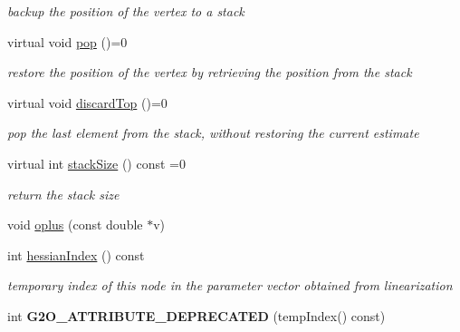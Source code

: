\begin{DoxyCompactItemize}
\begin{DoxyCompactList}\small\item\em backup the position of the vertex to a stack \end{DoxyCompactList}\item 
\hypertarget{classg2o_1_1OptimizableGraph_1_1Vertex_a3e36d925dbda1c574a285826ade5909a}{virtual void \hyperlink{classg2o_1_1OptimizableGraph_1_1Vertex_a3e36d925dbda1c574a285826ade5909a}{pop} ()=0}\label{classg2o_1_1OptimizableGraph_1_1Vertex_a3e36d925dbda1c574a285826ade5909a}

\begin{DoxyCompactList}\small\item\em restore the position of the vertex by retrieving the position from the stack \end{DoxyCompactList}\item 
\hypertarget{classg2o_1_1OptimizableGraph_1_1Vertex_a9509fb5c333988911312fc3d9187a9c3}{virtual void \hyperlink{classg2o_1_1OptimizableGraph_1_1Vertex_a9509fb5c333988911312fc3d9187a9c3}{discard\-Top} ()=0}\label{classg2o_1_1OptimizableGraph_1_1Vertex_a9509fb5c333988911312fc3d9187a9c3}

\begin{DoxyCompactList}\small\item\em pop the last element from the stack, without restoring the current estimate \end{DoxyCompactList}\item 
\hypertarget{classg2o_1_1OptimizableGraph_1_1Vertex_a0a4ecc894d008d9c3806a3660e7dfe6f}{virtual int \hyperlink{classg2o_1_1OptimizableGraph_1_1Vertex_a0a4ecc894d008d9c3806a3660e7dfe6f}{stack\-Size} () const =0}\label{classg2o_1_1OptimizableGraph_1_1Vertex_a0a4ecc894d008d9c3806a3660e7dfe6f}

\begin{DoxyCompactList}\small\item\em return the stack size \end{DoxyCompactList}\item 
void \hyperlink{classg2o_1_1OptimizableGraph_1_1Vertex_af4357b634cfd884cd2fa1abb05832ec8}{oplus} (const double $\ast$v)
\item 
\hypertarget{classg2o_1_1OptimizableGraph_1_1Vertex_a33009d06f2d3682a3c774182c807c48a}{int \hyperlink{classg2o_1_1OptimizableGraph_1_1Vertex_a33009d06f2d3682a3c774182c807c48a}{hessian\-Index} () const }\label{classg2o_1_1OptimizableGraph_1_1Vertex_a33009d06f2d3682a3c774182c807c48a}

\begin{DoxyCompactList}\small\item\em temporary index of this node in the parameter vector obtained from linearization \end{DoxyCompactList}\item 
\hypertarget{classg2o_1_1OptimizableGraph_1_1Vertex_a8f22181a161d724e95631d5da742b66a}{int {\bfseries G2\-O\-\_\-\-A\-T\-T\-R\-I\-B\-U\-T\-E\-\_\-\-D\-E\-P\-R\-E\-C\-A\-T\-E\-D} (temp\-Index() const)}\label{classg2o_1_1OptimizableGraph_1_1Vertex_a8f22181a161d724e95631d5da742b66a}


\end{DoxyCompactItemize}
